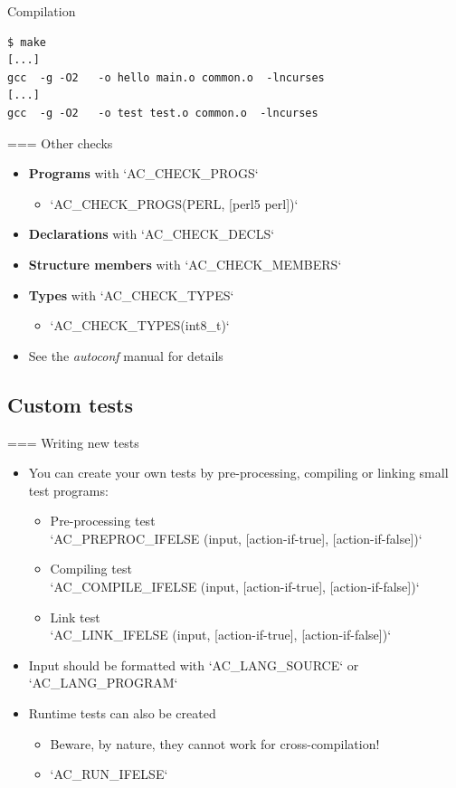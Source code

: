 \begin{block}{Compilation}
\begin{verbatim}
$ make
[...]
gcc  -g -O2   -o hello main.o common.o  -lncurses
[...]
gcc  -g -O2   -o test test.o common.o  -lncurses
\end{verbatim}
\end{block}



=== {Other checks}
  \begin{itemize}
  \item {\bf Programs} with `AC_CHECK_PROGS`
    \begin{itemize}
    \item `AC_CHECK_PROGS(PERL, [perl5 perl])`
    \end{itemize}
  \item {\bf Declarations} with `AC_CHECK_DECLS`
  \item {\bf Structure members} with `AC_CHECK_MEMBERS`
  \item {\bf Types} with `AC_CHECK_TYPES`
    \begin{itemize}
    \item `AC_CHECK_TYPES(int8_t)`
    \end{itemize}
  \item See the {\em autoconf} manual for details
  \end{itemize}


\subsection{Custom tests}

=== {Writing new tests}
  \begin{itemize}
  \item You can create your own tests by pre-processing, compiling or
    linking small test programs:
    \begin{itemize}
    \item Pre-processing test\\
      {\small `AC_PREPROC_IFELSE (input, [action-if-true], [action-if-false])`}
    \item Compiling test\\
      {\small `AC_COMPILE_IFELSE (input, [action-if-true], [action-if-false])`}
    \item Link test\\
      {\small `AC_LINK_IFELSE (input, [action-if-true], [action-if-false])`}
    \end{itemize}
  \item Input should be formatted with `AC_LANG_SOURCE` or
    `AC_LANG_PROGRAM`
  \item Runtime tests can also be created
    \begin{itemize}
    \item Beware, by nature, they cannot work for cross-compilation!
    \item `AC_RUN_IFELSE`
    \end{itemize}
  \end{itemize}


